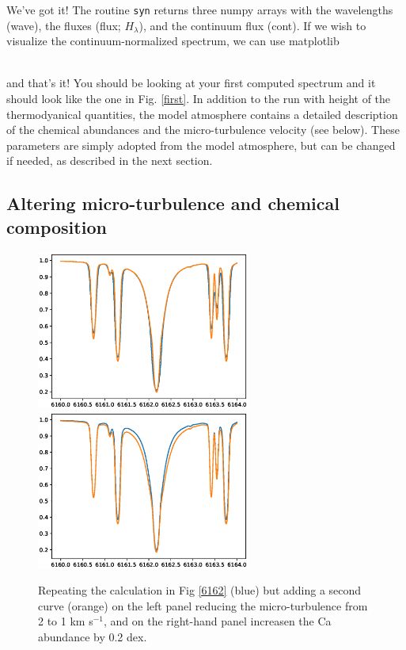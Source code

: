 \documentclass[]{article}
\begin{document}
\noindent We've got it! The routine {\tt syn} returns three numpy arrays with the wavelengths (wave), the fluxes (flux; $H_{\lambda}$), and the continuum flux (cont). If we wish to visualize the continuum-normalized spectrum, we can use matplotlib
\\
\\

\noindent and that's it! You should be looking at your first computed spectrum and it should look like the one in Fig. \ref{first}. In addition to the run with height of the thermodyanical quantities, the model atmosphere contains a detailed description of the chemical abundances and the micro-turbulence velocity (see below). These parameters are simply adopted from the model atmosphere, but can be changed if needed, as described in the next section.

\subsection{Altering micro-turbulence and chemical composition}
\label{abundances}

\begin{figure}[t!]
\centering
\includegraphics[width=7cm]{Figure_2a.ps}
\includegraphics[width=7cm]{Figure_2b.ps}
\caption{Repeating the calculation in Fig \ref{6162} (blue) but adding a second curve (orange) on the left panel reducing the micro-turbulence from 2 to 1 km s$^{-1}$, and on the right-hand panel increasen the Ca abundance by 0.2 dex.
\label{micro-abu}
}
\end{figure}
\end{document}
